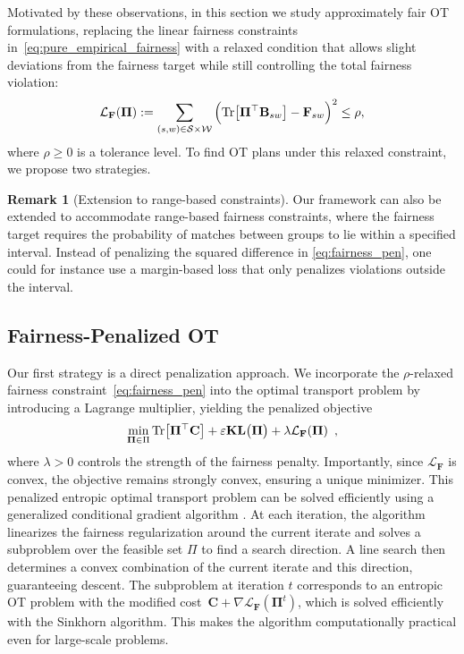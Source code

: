 \documentclass{article}
\newcommand{\kl}{\mathbf{KL}}
\theoremstyle{definition}
\newtheorem{remark}[theorem]{Remark}
\begin{document}
Motivated by these observations, in this section we study approximately fair OT formulations, replacing the linear fairness constraints in~\eqref{eq:pure_empirical_fairness} with a relaxed condition that allows slight deviations from the fairness target while still controlling the total fairness violation:
\begin{align}
\label{eq:fairness_pen}
\mathcal{L}_\mathbf{F}(\mathbf{\Pi}) := \sum_{(s,w) \in \mathcal{S}\times \mathcal{W}} \Big(\textnormal{Tr}\big[\mathbf{\Pi}^\top\mathbf{B}_{sw}\big] - \mathbf{F}_{sw}\Big)^2 \leq \rho,
\end{align}
where $\rho \geq 0$ is a tolerance level.
To find OT plans under this relaxed constraint, we propose two strategies.
\begin{remark}[Extension to range-based constraints]
     Our framework can also be extended to accommodate range-based fairness constraints, where the fairness target requires the probability of matches between groups to lie within a specified interval. Instead of penalizing the squared difference in \eqref{eq:fairness_pen}, one could for instance use a margin-based loss that only penalizes violations outside the interval.
\end{remark}
\subsection{Fairness-Penalized OT}\label{ssec:penalized_ot}
Our first strategy is a direct penalization approach. We incorporate the $\rho$-relaxed fairness constraint~\eqref{eq:fairness_pen} into the optimal transport problem by introducing a Lagrange multiplier, yielding the penalized objective
\begin{align}\label{eq:fairpenalizedOT-discrete}
     \min_{\mathbf{\Pi} \in \Pi} \textnormal{Tr}\big[\mathbf{\Pi}^\top \mathbf{C}\big] + \varepsilon\kl\big(\mathbf{\Pi}\big) + \lambda \mathcal{L}_\mathbf{F}(\mathbf{\Pi})\enspace,
\end{align}
where $\lambda > 0$ controls the strength of the fairness penalty. Importantly, since $\mathcal{L}_\mathbf{F}$ is convex, the objective remains strongly convex, ensuring a unique minimizer. This penalized entropic optimal transport problem can be solved efficiently using a generalized conditional gradient algorithm \citep{rakotomamonjy2015generalized}. At each iteration, the algorithm linearizes the fairness regularization around the current iterate and solves a subproblem over the feasible set $\Pi$ to find a search direction. A line search then determines a convex combination of the current iterate and this direction, guaranteeing descent. The subproblem at iteration $t$ corresponds to an entropic OT problem with the modified cost~$\mathbf{C} + \nabla\mathcal{L}_{\mathbf{F}}(\mathbf{\Pi}^t)$, which is solved efficiently with the Sinkhorn algorithm. This makes the algorithm computationally practical even for large-scale problems.
\end{document}
